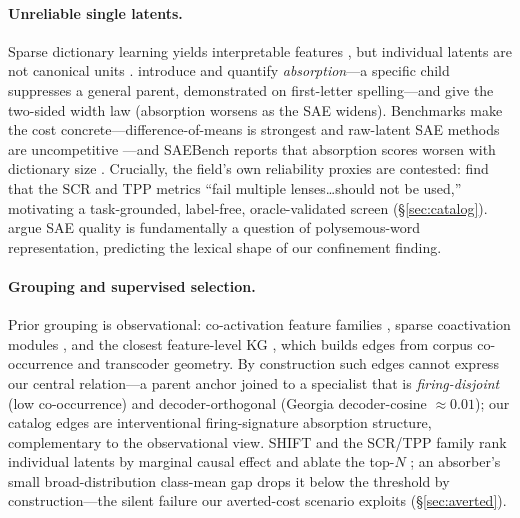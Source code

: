 \documentclass[11pt,letterpaper]{article}
\begin{document}
\paragraph{Unreliable single latents.} Sparse dictionary learning yields interpretable features \citep{Cunningham2023, Bricken2023, Templeton2024, Lieberum2024}, but individual latents are not canonical units \citep{Leask2025}. \citet{Chanin2024} introduce and quantify \emph{absorption}---a specific child suppresses a general parent, demonstrated on first-letter spelling---and \citet{Chanin2025} give the two-sided width law (absorption worsens as the SAE widens). Benchmarks make the cost concrete---difference-of-means is strongest and raw-latent SAE methods are uncompetitive \citep{Wu2025, Kantamneni2025}---and SAEBench reports that absorption scores worsen with dictionary size \citep{Karvonen2025}. Crucially, the field's own reliability proxies are contested: \citet{Chanin2026} find that the SCR and TPP metrics ``fail multiple lenses\ldots should not be used,'' motivating a task-grounded, label-free, oracle-validated screen (\S\ref{sec:catalog}). \citet{Minegishi2025} argue SAE quality is fundamentally a question of polysemous-word representation, predicting the lexical shape of our confinement finding.

\paragraph{Grouping and supervised selection.} Prior grouping is observational: co-activation feature families \citep{ONeill2024}, sparse coactivation modules \citep{Deng2025}, and the closest feature-level KG \citep{Winnicki2026}, which builds edges from corpus co-occurrence and transcoder geometry. By construction such edges cannot express our central relation---a parent anchor joined to a specialist that is \emph{firing-disjoint} (low co-occurrence) and decoder-orthogonal (Georgia decoder-cosine $\approx 0.01$); our catalog edges are interventional firing-signature absorption structure, complementary to the observational view. SHIFT and the SCR/TPP family rank individual latents by marginal causal effect and ablate the top-$N$ \citep{Marks2024, Karvonen2024}; an absorber's small broad-distribution class-mean gap drops it below the threshold by construction---the silent failure our averted-cost scenario exploits (\S\ref{sec:averted}).
\end{document}
